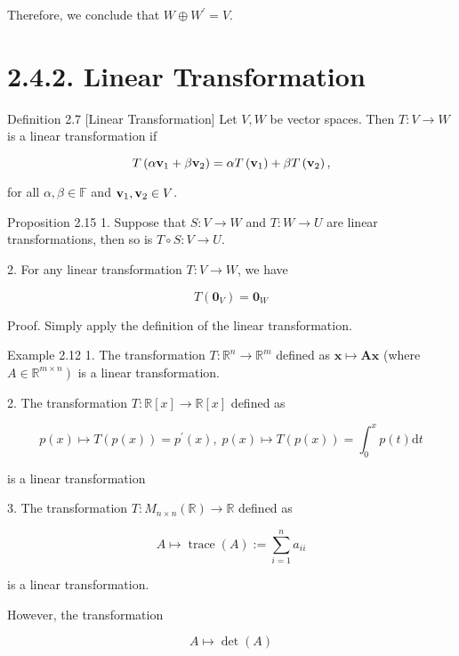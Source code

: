 \documentclass[11pt]{article}
\begin{document}
Therefore, we conclude that \(W \oplus  {W}^{\prime } = V\).

\section*{2.4.2. Linear Transformation}

Definition 2.7 [Linear Transformation] Let \(V,W\) be vector spaces. Then \(T : V \rightarrow  W\) is a linear transformation if

\[
T\left( {\alpha {\bf v}_1 + \beta {\bf v}_2}\right)  = {\alpha T}\left( {\bf v}_1\right)  + {\beta T}\left( {\bf v}_2\right) ,
\]

for all \(\alpha ,\beta  \in  \mathbb{F}\) and \({\bf v}_1,{\bf v}_2 \in  V\).

Proposition 2.15 1. Suppose that \(S : V \rightarrow  W\) and \(T : W \rightarrow  U\) are linear transformations, then so is \(T \circ  S : V \rightarrow  U\).

2. For any linear transformation \(T : V \rightarrow  W\), we have

\[
T\left( {\mathbf{0}}_{V}\right)  = {\mathbf{0}}_{W}
\]

Proof. Simply apply the definition of the linear transformation.

Example 2.12 1. The transformation \(T : {\mathbb{R}}^n \rightarrow  {\mathbb{R}}^{m}\) defined as \(\mathbf{x} \mapsto  \mathbf{{Ax}}\) (where \(\left. {A \in  {\mathbb{R}}^{m \times  n}}\right)\) is a linear transformation.

2. The transformation \(T : \mathbb{R}\left\lbrack  x\right\rbrack   \rightarrow  \mathbb{R}\left\lbrack  x\right\rbrack\) defined as

\[
p\left( x\right)  \mapsto  T\left( {p\left( x\right) }\right)  = {p}^{\prime }\left( x\right) ,\;p\left( x\right)  \mapsto  T\left( {p\left( x\right) }\right)  = {\int }_{0}^{x}p\left( t\right) \mathrm{d}t
\]

is a linear transformation

3. The transformation \(T : {M}_{n \times  n}\left( \mathbb{R}\right)  \rightarrow  \mathbb{R}\) defined as

\[
A \mapsto  \operatorname{trace}\left( A\right)  \mathrel{\text{ := }} \mathop{\sum }\limits_{{i = 1}}^n{a}_{ii}
\]

is a linear transformation.

However, the transformation

\[
A \mapsto  \det \left( A\right)
\]
\end{document}

